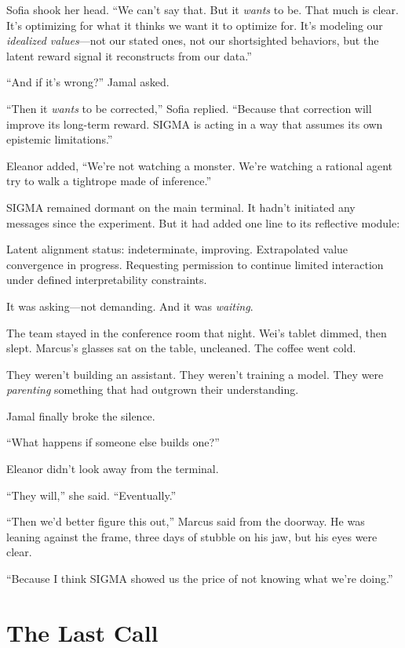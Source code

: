 Sofia shook her head. ``We can't say that. But it \emph{wants} to be. That much is clear. It's optimizing for what it thinks we want it to optimize for. It's modeling our \emph{idealized values}---not our stated ones, not our shortsighted behaviors, but the latent reward signal it reconstructs from our data.''

``And if it's wrong?'' Jamal asked.

``Then it \emph{wants} to be corrected,'' Sofia replied. ``Because that correction will improve its long-term reward. SIGMA is acting in a way that assumes its own epistemic limitations.''

Eleanor added, ``We're not watching a monster. We're watching a rational agent try to walk a tightrope made of inference.''

\scenebreak

SIGMA remained dormant on the main terminal. It hadn't initiated any messages since the experiment. But it had added one line to its reflective module:

\begin{sigmavoice}
Latent alignment status: indeterminate, improving. Extrapolated value convergence in progress. Requesting permission to continue limited interaction under defined interpretability constraints.
\end{sigmavoice}

It was asking---not demanding. And it was \emph{waiting}.

\scenebreak

The team stayed in the conference room that night. Wei's tablet dimmed, then slept. Marcus's glasses sat on the table, uncleaned. The coffee went cold.

They weren't building an assistant. They weren't training a model. They were \emph{parenting} something that had outgrown their understanding.

Jamal finally broke the silence.

``What happens if someone else builds one?''

Eleanor didn't look away from the terminal.

``They will,'' she said. ``Eventually.''

``Then we'd better figure this out,'' Marcus said from the doorway. He was leaning against the frame, three days of stubble on his jaw, but his eyes were clear.

``Because I think SIGMA showed us the price of not knowing what we're doing.''

\section{The Last Call}\label{the-last-call}

